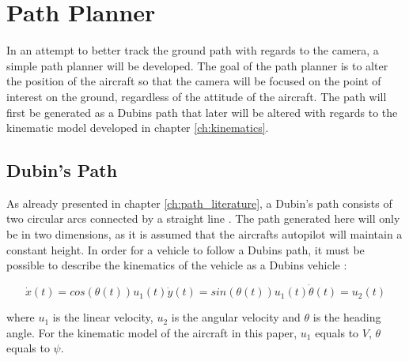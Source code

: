 \section{Path Planner}

In an attempt to better track the ground path with regards to the camera, a simple path planner will be developed. The goal of the path planner is to alter the position of the aircraft so that the camera will be focused on the point of interest on the ground, regardless of the attitude of the aircraft. The path will first be generated as a Dubins path that later will be altered with regards to the kinematic model developed in chapter \ref{ch:kinematics}.


\subsection{Dubin's Path}
\label{ch:dubins_path}

As already presented in chapter \ref{ch:path_literature}, a Dubin's path consists of two circular arcs connected by a straight line \cite{DUBIN}. The path generated here will only be in two dimensions, as it is assumed that the aircrafts autopilot will maintain a constant height. In order for a vehicle to follow a Dubins path, it must be possible to describe the kinematics of the vehicle as a Dubins vehicle \cite{dubinYONG}:

\begin{subequations}
\begin{equation}
	\dot{x}(t) = cos(\theta(t))u_1(t)
\end{equation}
\begin{equation}
	\dot{y}(t) = sin(\theta(t))u_1(t)
\end{equation}
\begin{equation}
	\dot{\theta}(t) = u_2(t)
\end{equation}
\end{subequations}

where $u_1$ is the linear velocity, $u_2$ is the angular velocity and $\theta$ is the heading angle. For the kinematic model of the aircraft in this paper, $u_1$ equals to $V$, $\theta$ equals to $\psi$.

